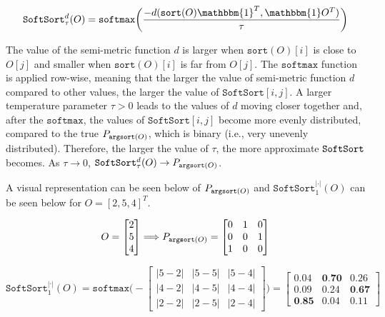 \begin{equation} \label{eq:softsort_def}
	\texttt{SoftSort}^d_{\tau}(O) = \texttt{softmax}\bigg( \frac{-d(\texttt{sort}(O)\mathbbm{1}^T, \mathbbm{1}O^T)}{\tau} \bigg)
\end{equation}

The value of the semi-metric function $d$ is larger when $\texttt{sort}(O)[i]$ is close to $O[j]$ and smaller when $\texttt{sort}(O)[i]$ is far from $O[j]$. The $\texttt{softmax}$ function is applied row-wise, meaning that the larger the value of semi-metric function $d$ compared to other values, the larger the value of $\texttt{SoftSort}[i,j]$. A larger temperature parameter $\tau>0$ leads to the values of $d$ moving closer together and, after the $\texttt{softmax}$, the values of $\texttt{SoftSort}[i,j]$ become more evenly distributed, compared to the true $P_{\operatorname*{\texttt{argsort}}(O)}$, which is binary (i.e., very unevenly distributed). Therefore, the larger the value of $\tau$, the more approximate $\operatorname*{\texttt{SoftSort}}$ becomes. As $\tau \to 0$, $\operatorname*{\texttt{SoftSort}}^d_{\tau}(O) \to P_{\operatorname*{\texttt{argsort}}(O)}$.

A visual representation can be seen below of $P_{\operatorname*{\texttt{argsort}}(O)}$ and $\texttt{SoftSort}^{|\cdot|}_{1}(O)$ can be seen below for $O = [2,5,4]^T$.

\begin{equation}
	O = \begin{bmatrix}
		2 \\
		5 \\
		4
	\end{bmatrix}
	\Longrightarrow
	P_{\operatorname*{\texttt{argsort}}(O)} =
	\begin{bmatrix}
		0 & 1 & 0 \\
		0 & 0 & 1 \\
		1 & 0 & 0 \\
	\end{bmatrix}
\end{equation}

\begin{equation} \label{eq:softsort_example}
	\texttt{SoftSort}^{|\cdot|}_{1}(O) = 
	\texttt{softmax} \Bigg(-\begin{bmatrix}
		|5-2| & |5-5| & |5-4| \\
		|4-2| & |4-5| & |4-4| \\
		|2-2| & |2-5| & |2-4|
	\end{bmatrix} \Bigg)	
	=
	\begin{bmatrix}
		0.04 & \textbf{0.70} & 0.26 \\
		0.09 & 0.24 & \textbf{0.67} \\
		\textbf{0.85} & 0.04 & 0.11
	\end{bmatrix}
\end{equation}

